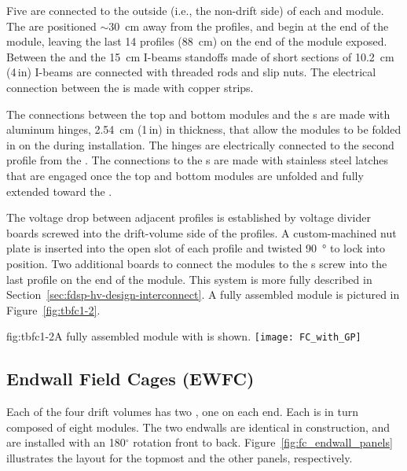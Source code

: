 Five  are connected to the outside (i.e., the non-drift side) of each  and  module. The  are positioned $\sim$\SI{30}{\cm} away from the profiles, and begin at the  end of the module, leaving the last 14 profiles (\SI{88}{\cm}) on the  end of the module exposed. Between the  and the \SI{15}{\cm} I-beams standoffs made of short sections of \SI{10.2}{\cm} (4\,in)   I-beams are connected with  threaded rods and slip nuts. The electrical connection between the  is made with copper strips.

The connections between the top and bottom modules and the s are made with aluminum hinges, \SI{2.54}{\cm} (1\,in) in thickness, that allow the modules to be folded in on the  during installation. The hinges are electrically connected to the second profile from the . The connections to the s are made with stainless steel latches that are engaged once the top and bottom  modules are unfolded and fully extended toward the .

The voltage drop between adjacent profiles is established by voltage divider boards screwed into the drift-volume side of the profiles. A custom-machined nut plate %
is inserted into the open slot of each profile and twisted \SI{90}{\degree} %
to lock into position. Two additional boards to connect the modules to the s %
screw into the last profile on the  end of the module. This system is %
more fully described in Section~\ref{sec:fdsp-hv-design-interconnect}. A fully assembled module is pictured in Figure~\ref{fig:tbfc1-2}.

\begin{dunefigure}{fig:tbfc1-2}{A fully assembled  module with  is shown.} %
\texttt{[image: FC\_with\_GP]}
\end{dunefigure}


\subsection{Endwall Field Cages (EWFC)}
\label{sec:fdsp-hv-des-fc-ewfc}


Each of the four drift volumes has two , one on each end. Each  is in turn composed of eight  modules.  The two endwalls are identical in construction, and are installed with an 180$^\circ$ rotation front to back.
Figure~\ref{fig:fc_endwall_panels} illustrates the layout for the topmost 
and the other panels, respectively.



